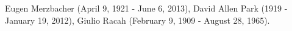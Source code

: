 Eugen Merzbacher (April 9, 1921 - June 6, 2013),
David Allen Park (1919 - January 19, 2012), 
Giulio Racah (February 9, 1909 - August 28, 1965).
